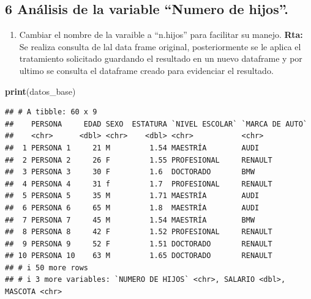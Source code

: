 \documentclass[
]{article}
\newenvironment{Shaded}{\begin{snugshade}}{\end{snugshade}}
\newcommand{\CommentTok}[1]{\textcolor[rgb]{0.56,0.35,0.01}{\textit{#1}}}
\newcommand{\FunctionTok}[1]{\textcolor[rgb]{0.13,0.29,0.53}{\textbf{#1}}}
\newcommand{\NormalTok}[1]{#1}
\providecommand{\tightlist}{%
  \setlength{\itemsep}{0pt}\setlength{\parskip}{0pt}}
\begin{document}
\begin{Shaded}
\end{Shaded}

\newpage

\subsection{6 Análisis de la variable ``Numero de
hijos''.}\label{anuxe1lisis-de-la-variable-numero-de-hijos.}

\begin{enumerate}
\def\labelenumi{\alph{enumi}.}
\tightlist
\item
  Cambiar el nombre de la varaible a ``n.hijos'' para facilitar su
  manejo. \textbf{Rta:} Se realiza consulta de lal data frame original,
  posteriormente se le aplica el tratamiento solicitado guardando el
  resultado en un nuevo dataframe y por ultimo se consulta el dataframe
  creado para evidenciar el resultado.
\end{enumerate}

\begin{Shaded}
\begin{Highlighting}[]
\FunctionTok{print}\NormalTok{(datos\_base)}
\end{Highlighting}
\end{Shaded}

\begin{verbatim}
## # A tibble: 60 x 9
##    PERSONA     EDAD SEXO  ESTATURA `NIVEL ESCOLAR` `MARCA DE AUTO`
##    <chr>      <dbl> <chr>    <dbl> <chr>           <chr>          
##  1 PERSONA 1     21 M         1.54 MAESTRÍA        AUDI           
##  2 PERSONA 2     26 F         1.55 PROFESIONAL     RENAULT        
##  3 PERSONA 3     30 F         1.6  DOCTORADO       BMW            
##  4 PERSONA 4     31 f         1.7  PROFESIONAL     RENAULT        
##  5 PERSONA 5     35 M         1.71 MAESTRÍA        AUDI           
##  6 PERSONA 6     65 M         1.8  MAESTRÍA        AUDI           
##  7 PERSONA 7     45 M         1.54 MAESTRÍA        BMW            
##  8 PERSONA 8     42 F         1.52 PROFESIONAL     RENAULT        
##  9 PERSONA 9     52 F         1.51 DOCTORADO       RENAULT        
## 10 PERSONA 10    63 M         1.65 DOCTORADO       RENAULT        
## # i 50 more rows
## # i 3 more variables: `NUMERO DE HIJOS` <chr>, SALARIO <dbl>, MASCOTA <chr>
\end{verbatim}
\end{document}
